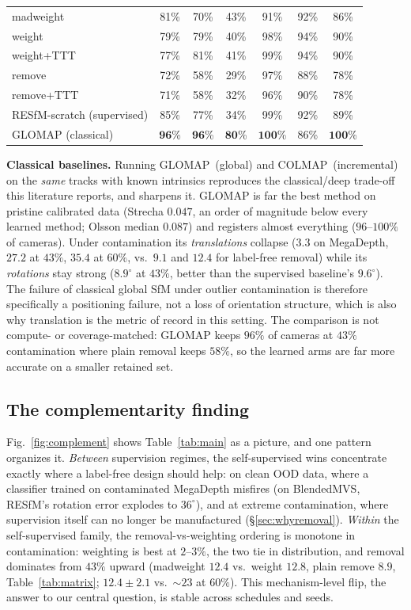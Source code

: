\documentclass{article}
\newcommand{\mad}{madweight}
\renewcommand{\deg}{^{\circ}}
\begin{document}
\begin{table}[t]
{\begin{tabular}{lcccccc}
\mad{}       & 81\% & 70\% & 43\% & 91\% & 92\% & 86\%\\
weight       & 79\% & 79\% & 40\% & 98\% & 94\% & 90\%\\
weight+TTT   & 77\% & 81\% & 41\% & 99\% & 94\% & 90\%\\
remove       & 72\% & 58\% & 29\% & 97\% & 88\% & 78\%\\
remove+TTT   & 71\% & 58\% & 32\% & 96\% & 90\% & 78\%\\
RESfM-scratch (supervised)  & 85\% & 77\% & 34\% & 99\% & 92\% & 89\%\\
GLOMAP (classical)          & $\mathbf{96}$\% & $\mathbf{96}$\% & $\mathbf{80}$\% & $\mathbf{100}$\% & 86\% & $\mathbf{100}$\%\\
\bottomrule
\end{tabular}}
\end{table}


\noindent\textbf{Classical baselines.} Running GLOMAP~(global) and COLMAP~(incremental)
on the \emph{same} tracks with known intrinsics reproduces the classical/deep trade-off
this literature reports, and sharpens it. GLOMAP is far the best method on pristine
calibrated data (Strecha $0.047$, an order of magnitude below every learned method;
Olsson median $0.087$) and registers almost everything ($96$--$100\%$ of cameras). Under
contamination its \emph{translations} collapse ($3.3$ on MegaDepth, $27.2$ at $43\%$,
$35.4$ at $60\%$, vs.\ $9.1$ and $12.4$ for label-free removal) while its
\emph{rotations} stay strong ($8.9\deg$ at $43\%$, better than the supervised
baseline's $9.6\deg$). The failure of classical global SfM under outlier contamination is
therefore specifically a positioning failure, not a loss of orientation structure, which
is also why translation is the metric of record in this setting. The comparison is not
compute- or coverage-matched: GLOMAP keeps $96\%$ of cameras at $43\%$ contamination
where plain removal keeps $58\%$, so the learned arms are far more accurate on a smaller
retained set.

\subsection{The complementarity finding}
Fig.~\ref{fig:complement} shows Table~\ref{tab:main} as a picture, and one pattern
organizes it. \emph{Between} supervision regimes, the self-supervised wins concentrate
exactly where a label-free design should help: on clean OOD data, where a classifier
trained on contaminated MegaDepth misfires (on BlendedMVS, RESfM's rotation error explodes
to $36\deg$), and at extreme contamination, where supervision itself can no longer be
manufactured (\S\ref{sec:whyremoval}). \emph{Within} the self-supervised family, the
removal-vs-weighting ordering is monotone in contamination: weighting is best at
$2$--$3\%$, the two tie in distribution, and removal dominates from $43\%$ upward
(\mad{} $12.4$ vs.\ weight $12.8$, plain remove $8.9$, Table~\ref{tab:matrix};
$12.4\pm2.1$ vs.\ $\sim\!23$ at $60\%$). This mechanism-level flip, the answer to our central
question, is stable across schedules and seeds.
\end{document}

